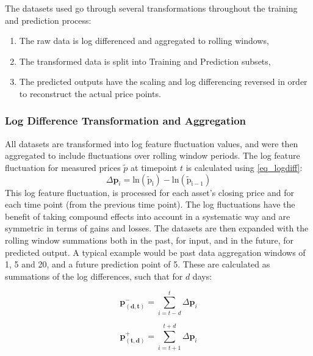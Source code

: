 \documentclass[a4paper,11pt,oneside]{article}
\theoremstyle{plain}
\theoremstyle{definition}
\begin{document}
	The datasets used go through several transformations throughout the training and prediction process:
	
	\begin{enumerate}
		\item The raw data is log differenced and aggregated to rolling windows,
		\item The transformed data is split into Training and Prediction subsets,
		\item The predicted outputs have the scaling and log differencing reversed in order to reconstruct the actual price points.
	\end{enumerate}
		
	\subsubsection{Log Difference Transformation and Aggregation}\label{ldata_og_difference}
	All datasets are transformed into log feature fluctuation values, and were then aggregated to include fluctuations over rolling window periods. The log feature fluctuation for measured prices $\tilde{p}$ at timepoint $t$ is calculated using \eqref{eq_logdiff}:
	\begin{equation}\label{eq_logdiff}
	\Delta\mathbf{p}_i = \mathrm{ln(\tilde{p}_i) - \mathrm{ln}(\tilde{p}_{i-1})}
	\end{equation}
	This log feature fluctuation,  is processed for each asset's closing price and for each time point (from the previous time point). The log fluctuations have the benefit of taking compound effects into account in a systematic way and are symmetric in terms of gains and losses.
	\newline\newline
	The datasets are then expanded with the rolling window summations both in the past, for input, and in the future, for predicted output. A typical example would be past data aggregation windows of 1, 5 and 20, and a future prediction point of 5. These are calculated as summations of the log differences, such that for $d$ days:
	
	\begin{equation}\label{eq_price_agg_past}
	 \mathbf{p^{-}_{(d,t)}} = \sum_{i = t-d}^{t} \Delta\mathbf{p}_i
	\end{equation}
	
	\begin{equation}\label{eq_price_agg_future}
	 \mathbf{p^{+}_{(t,d)}} = \sum_{i = t+1}^{t+d} \Delta\mathbf{p}_i
	\end{equation}
	
\end{document}
